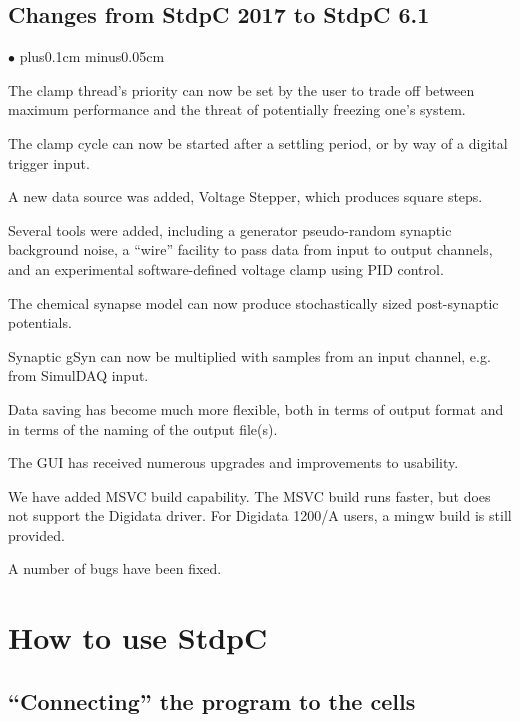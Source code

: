 \documentclass{article}
\newenvironment{myitem}{\begin{list}{$\bullet$}{\setlength{\leftmargin}{1.1em}
\itemsep0.1cm plus0.1cm minus0.05cm
\listparindent0cm
\addtolength{\labelsep}{0.5\labelsep}
\setlength{\labelwidth}{0.8em}
\setlength{\leftmargin}{\labelwidth}
\addtolength{\leftmargin}{\labelsep}
}}{\end{list}}
\begin{document}
\subsection{Changes from StdpC 2017 to StdpC 6.1}
\begin{myitem}
\item The clamp thread's priority can now be set by the user to trade off between maximum performance
and the threat of potentially freezing one's system.
\item The clamp cycle can now be started after a settling period, or by way of a digital trigger input.
\item A new data source was added, Voltage Stepper, which produces square steps.
\item Several tools were added, including a generator pseudo-random synaptic background noise, a
``wire'' facility to pass data from input to output channels, and an experimental software-defined
voltage clamp using PID control.
\item The chemical synapse model can now produce stochastically sized post-synaptic potentials.
\item Synaptic gSyn can now be multiplied with samples from an input channel, e.g. from SimulDAQ input.
\item Data saving has become much more flexible, both in terms of output format and in terms of the naming
of the output file(s).
\item The GUI has received numerous upgrades and improvements to usability.
\item We have added MSVC build capability. The MSVC build runs faster, but does not support the Digidata
driver. For Digidata 1200/A users, a mingw build is still provided.
\item A number of bugs have been fixed.
\end{myitem}

\section{How to use StdpC}

\subsection{``Connecting'' the program to the cells}
 
\end{document}
